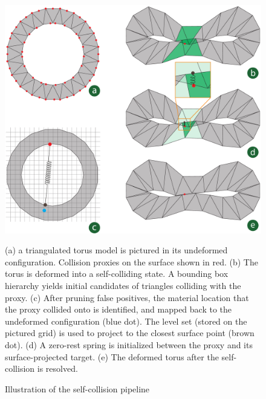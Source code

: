 \begin{figure}
  \centering
\includegraphics[width=0.95\columnwidth]{chapter_nonmanifoldlevelsets/images/torus-combined-latest.pdf}
\caption{Illustration of the self-collision pipeline}{(a) a
  triangulated torus model is pictured in its undeformed
  configuration. Collision proxies on the surface shown in red.  (b)
  The torus is deformed into a self-colliding state. A bounding box
  hierarchy yields initial candidates of triangles colliding with the
  proxy.  (c) After pruning false positives, the material location
  that the proxy collided onto is identified, and mapped back to the
  undeformed configuration (blue dot). The level set (stored on the
  pictured grid) is used to project to the closest surface point
  (brown dot).  (d) A zero-rest spring is initialized between the
  proxy and its surface-projected target.  (e) The deformed torus
  after the self-collision is resolved.}
\label{fig:self-collision-handling}
\end{figure}



